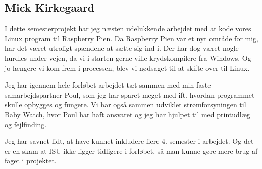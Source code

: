 \subsection*{Mick Kirkegaard}

I dette semesterprojekt har jeg næsten udelukkende arbejdet med at kode vores Linux program til Raspberry Pien. Da Raspberry Pien var et nyt område for mig, har det været utroligt spændene at sætte sig ind i. Der har dog været nogle hurdles under vejen, da vi i starten gerne ville krydskompilere fra Windows. Og jo længere vi kom frem i processen, blev vi nødsaget til at skifte over til Linux.

Jeg har igennem hele forløbet arbejdet tæt sammen med min faste samarbejdspartner Poul, som jeg har sparet meget med ift. hvordan programmet skulle opbygges og fungere. Vi har også sammen udviklet strømforsyningen til Baby Watch, hvor Poul har haft ansvaret og jeg har hjulpet til med printudlæg og fejlfinding.

Jeg har savnet lidt, at have kunnet inkludere flere 4. semester i arbejdet. Og det er en skam at ISU ikke ligger tidligere i forløbet, så man kunne gøre mere brug af faget i projektet. 
